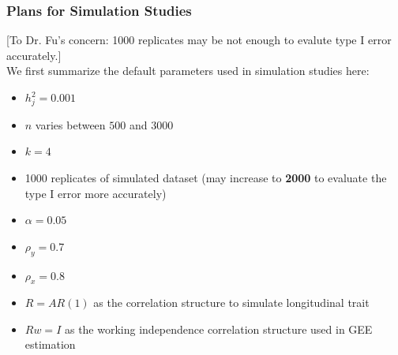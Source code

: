 \documentclass[12pt]{article}
\begin{document}
\subsubsection{Plans for Simulation Studies}\label{sec:subsub1-3}
[To Dr. Fu's concern: 1000 replicates may be not enough to evalute type I error accurately.]\\
We first summarize the default parameters used in simulation studies here:
\begin{itemize}
\item $h_j^2 = 0.001$
\item $n$ varies between $500$ and $3000$ 
\item $k = 4$
\item 1000 replicates of simulated dataset (may increase to \textbf{2000} to evaluate the type I error more accurately)
\item $\alpha = 0.05$
\item $\rho_y = 0.7$
\item $\rho_x = 0.8$
\item $R = AR(1)$ as the correlation structure to simulate longitudinal trait
\item $Rw = I$ as the working independence correlation structure used in GEE estimation
\end{itemize}
\end{document}

